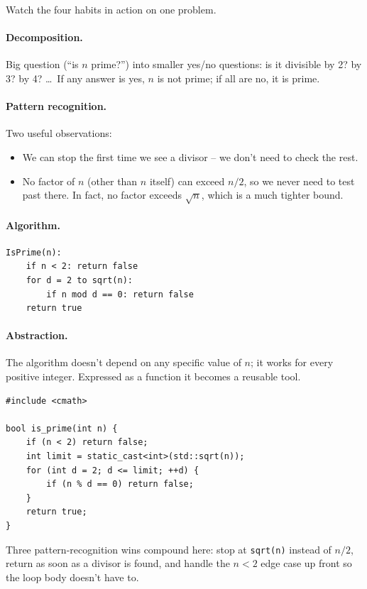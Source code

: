 \documentclass[11pt]{article}
\begin{document}
Watch the four habits in action on one problem.

\paragraph{Decomposition.} Big question (``is $n$ prime?'') into
smaller yes/no questions: is it divisible by 2? by 3? by 4? \ldots\ If
any answer is yes, $n$ is not prime; if all are no, it is prime.

\paragraph{Pattern recognition.} Two useful observations:
\begin{itemize}[leftmargin=*,noitemsep]
    \item We can stop the first time we see a divisor -- we don't need
          to check the rest.
    \item No factor of $n$ (other than $n$ itself) can exceed $n/2$,
          so we never need to test past there. In fact, no factor
          exceeds $\sqrt{n}$, which is a much tighter bound.
\end{itemize}

\paragraph{Algorithm.}
\begin{verbatim}
IsPrime(n):
    if n < 2: return false
    for d = 2 to sqrt(n):
        if n mod d == 0: return false
    return true
\end{verbatim}

\paragraph{Abstraction.} The algorithm doesn't depend on any specific
value of $n$; it works for every positive integer. Expressed as a
function it becomes a reusable tool.

\begin{examplebox}[C++ translation]
\begin{verbatim}
#include <cmath>

bool is_prime(int n) {
    if (n < 2) return false;
    int limit = static_cast<int>(std::sqrt(n));
    for (int d = 2; d <= limit; ++d) {
        if (n % d == 0) return false;
    }
    return true;
}
\end{verbatim}
Three pattern-recognition wins compound here: stop at \texttt{sqrt(n)}
instead of $n/2$, return as soon as a divisor is found, and handle the
$n < 2$ edge case up front so the loop body doesn't have to.
\end{examplebox}
\end{document}
